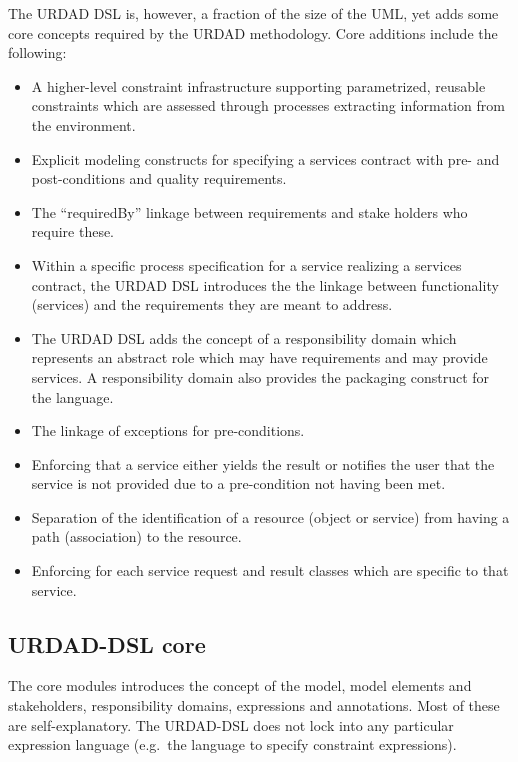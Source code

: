 The URDAD DSL is, however, a fraction of the size of the UML, yet adds some core concepts required by the URDAD methodology. Core additions include the following:
\begin{itemize}
  \item A higher-level constraint infrastructure supporting parametrized, reusable constraints which are assessed through processes extracting information from the environment.
  \item Explicit modeling constructs for specifying a services contract with pre- and post-conditions and quality requirements.
  \item The ``requiredBy'' linkage between requirements and stake holders who require these.
  \item Within a specific process specification for a service realizing a services contract, the URDAD DSL introduces the the linkage between functionality (services) and the requirements they are meant to address. 
  \item The URDAD DSL adds the concept of a responsibility domain which represents an abstract role which may have requirements and may provide services. A responsibility domain also provides the packaging construct for the language.
  \item The linkage of exceptions for pre-conditions.
  \item Enforcing that a service either yields the result or notifies the user that the service is not provided due to a pre-condition not having been met.
  \item Separation of the identification of a resource (object or service) from having a path (association) to the resource.
  \item Enforcing for each service request and result classes which are specific to that service.
\end{itemize}


\subsection{URDAD-DSL core}

The core modules introduces the concept of the model, model elements and stakeholders, responsibility domains, expressions and annotations. Most of these are self-explanatory. The URDAD-DSL does not lock into any particular expression language (e.g.\ the language to specify constraint expressions). 

